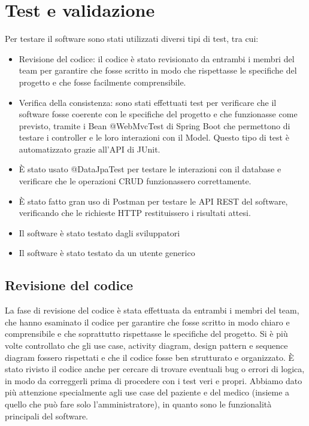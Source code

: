 \documentclass[a4paper]{article}
\begin{document}
\pagebreak

\section{Test e validazione}

Per testare il software sono stati utilizzati diversi tipi di test, tra cui:
\begin{itemize}
  \item Revisione del codice: il codice è stato revisionato da entrambi i membri del team per garantire che fosse scritto 
  in modo che rispettasse le specifiche del progetto e che fosse facilmente comprensibile.
  \item Verifica della consistenza: sono stati effettuati test per verificare che il software fosse coerente con le specifiche del progetto e che
  funzionasse come previsto, tramite i Bean @WebMvcTest di Spring Boot che permettono di testare i controller e le loro interazioni con il Model.
  Questo tipo di test è automatizzato grazie all'API di JUnit. 
  \item È stato usato @DataJpaTest per testare le interazioni con il database e verificare che le operazioni CRUD funzionassero correttamente.
  \item È stato fatto gran uso di Postman per testare le API REST del software, verificando che le richieste HTTP restituissero i risultati attesi.
  \item Il software è stato testato dagli sviluppatori
  \item Il software è stato testato da un utente generico
\end{itemize}

\subsection{Revisione del codice}

La fase di revisione del codice è stata effettuata da entrambi i membri del team, che hanno esaminato il codice 
per garantire che fosse scritto in modo chiaro e comprensibile e che soprattutto rispettasse le specifiche 
del progetto. Si è più volte controllato che gli use case, activity diagram, design pattern e sequence diagram 
fossero rispettati e che il codice fosse ben strutturato e organizzato. È stato rivisto il codice anche per 
cercare di trovare eventuali bug o errori di logica, in modo da correggerli prima di procedere con i test veri e propri.
Abbiamo dato più attenzione specialmente agli use case del paziente e del medico (insieme a quello che
può fare solo l'amministratore), in quanto sono le funzionalità principali del software.
\end{document}
